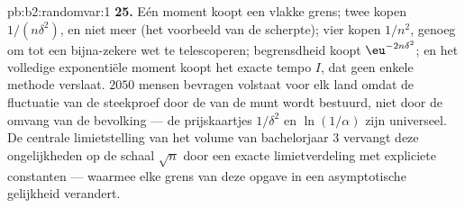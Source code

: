 \begin{solution}{pb:b2:randomvar:1}
\textbf{25.} Eén moment koopt een vlakke grens; twee kopen
$1/(n\delta^2)$, en niet meer (het voorbeeld van de scherpte); vier
kopen $1/n^2$, genoeg om tot een bijna-zekere wet te telescoperen;
begrensdheid koopt $\eu^{-2n\delta^2}$; en het volledige
exponentiële moment koopt het exacte tempo $I$, dat geen enkele
methode verslaat. $2050$ mensen bevragen volstaat voor elk land
omdat de fluctuatie van de steekproef door de  van de munt
wordt bestuurd, niet door de omvang van de bevolking --- de
prijskaartjes $1/\delta^2$ en $\ln(1/\alpha)$ zijn universeel. De
centrale limietstelling van het volume van bachelorjaar 3 vervangt
deze ongelijkheden op de schaal $\sqrt n$ door een exacte
limietverdeling met expliciete constanten --- waarmee elke grens
van deze opgave in een asymptotische gelijkheid verandert.
\end{solution}
